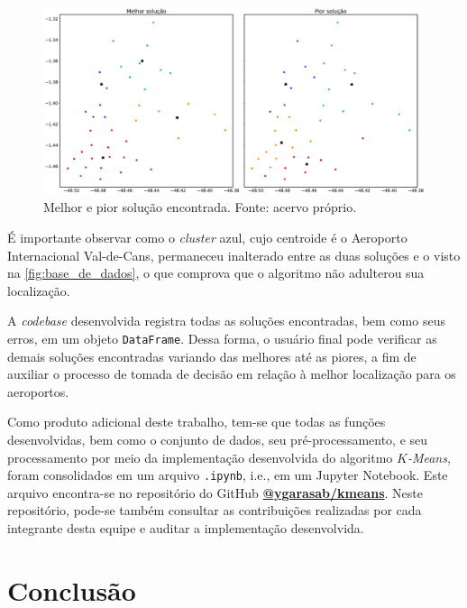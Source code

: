 \documentclass[12pt]{article}
\begin{document}
\begin{figure}[t!]
    \includegraphics[width=\linewidth]{figures/resultados}
    \caption{Melhor e pior solução encontrada. Fonte: acervo próprio.}
    \label{fig:resultados}
\end{figure}

É importante observar como o \textit{cluster} azul, cujo centroide é o Aeroporto Internacional Val-de-Cans, permaneceu inalterado entre as duas soluções e o visto na \autoref{fig:base_de_dados}, o que comprova que o algoritmo não adulterou sua localização.

A \textit{codebase} desenvolvida registra todas as soluções encontradas, bem como seus erros, em um objeto \texttt{DataFrame}. Dessa forma, o usuário final pode verificar as demais soluções encontradas variando das melhores até as piores, a fim de auxiliar o processo de tomada de decisão em relação à melhor localização para os aeroportos.

Como produto adicional deste trabalho, tem-se que todas as funções desenvolvidas, bem como o conjunto de dados, seu pré-processamento, e seu processamento por meio da implementação desenvolvida do algoritmo \textit{$K$-Means}, foram consolidados em um arquivo \texttt{.ipynb}, i.e., em um Jupyter Notebook. Este arquivo encontra-se no repositório do GitHub \textbf{\href{https://github.com/ygarasab/kmeans}{@ygarasab/kmeans}}. Neste repositório, pode-se também consultar as contribuições realizadas por cada integrante desta equipe e auditar a implementação desenvolvida.


\section{Conclusão}   %
\label{sec:conclusao} %
\end{document}
